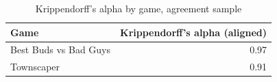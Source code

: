 \begin{table}[t]
\centering
\caption{Krippendorff's alpha by game, agreement sample}
\label{tab:rq5-krippendorff-alpha}
\begin{tabular}{lr}
\toprule
Game & Krippendorff's alpha (aligned) \\
\midrule
Best Buds vs Bad Guys & 0.97 \\
Townscaper & 0.91 \\
\bottomrule
\end{tabular}
\end{table}
